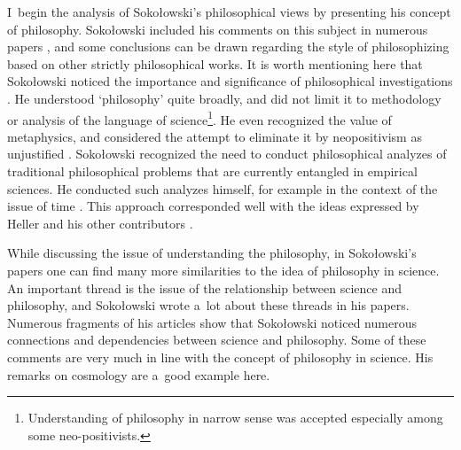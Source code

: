 \documentclass[%
  manuscript=article,
  year=2024,
  volume=77,
  doi=00000.000,
]{zfn}
\begin{document}
I~begin the analysis of Sokołowski's philosophical views by presenting his concept of philosophy. Sokołowski included his comments on this subject in numerous papers 
\parencites[][]{}[][]{}[][]{}[][]{}[][]{}, %
 and some conclusions can be drawn regarding the style of philosophizing based on other strictly philosophical works. It is worth mentioning here that Sokołowski noticed the importance and significance of philosophical investigations 
\parencite[][p.63]{}. %
 He understood ‘philosophy' quite broadly, and did not limit it to methodology or analysis of the language of science\footnote{Understanding of philosophy in narrow sense was accepted especially among some neo-positivists.}. He even recognized the value of metaphysics, and considered the attempt to eliminate it by neopositivism as unjustified 
\parencite[][p.198]{}. %
 Sokołowski recognized the need to conduct philosophical analyzes of traditional philosophical problems that are currently entangled in empirical sciences. He conducted such analyzes himself, for example in the context of the issue of time 
\parencite[][]{}. %
 This approach corresponded well with the ideas expressed by Heller and his other contributors 
\parencites[][]{Heller1999Jak}[][]{Polak2019Philosophy}.%




While discussing the issue of understanding the philosophy, in Sokołowski's papers one can find many more similarities to the idea of philosophy in science. An important thread is the issue of the relationship between science and philosophy, and Sokołowski wrote a~lot about these threads in his papers. Numerous fragments of his articles show that Sokołowski noticed numerous connections and dependencies between science and philosophy. Some of these comments are very much in line with the concept of philosophy in science. His remarks on cosmology are a~good example here.
\end{document}
